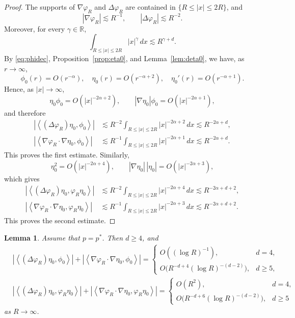 \documentclass[12pt, a4paper, reqno]{amsart}
\numberwithin{equation}{section}
\newtheorem{lemma}[theorem]{Lemma}
\theoremstyle{definition}
\theoremstyle{remark}
\newcommand{\R}{\mathbb R}
\def\tbra[#1,#2]{{\left\langle #1,#2\right\rangle}}
\def\abs[#1]{{\left\vert #1 \right\vert}}
\begin{document}
\begin{proof}
The supports of $\nabla\varphi_R$ and $\Delta\varphi_R$ are contained in
$\{R\le|x|\le2R\}$, and
\[
  \abs[\nabla\varphi_R]\lesssim R^{-1},
  \qquad
  \abs[\Delta\varphi_R]\lesssim R^{-2}.
\]
Moreover, for every $\gamma\in\R$,
\[
  \int_{R\le|x|\le2R}|x|^\gamma\,dx\lesssim R^{\gamma+d}.
\]
By \eqref{eq:phidec}, Proposition~\ref{prop:eta0}, and
Lemma~\ref{lem:deta0}, we have, as \(r\to\infty\),
\[
  \phi_0(r)=O(r^{-\alpha}),
  \quad
  \eta_0(r)=O(r^{-\alpha+2}),
  \quad
  \eta_0'(r)=O(r^{-\alpha+1}).
\]
Hence, as \(|x|\to\infty\),
\[
  \eta_0\phi_0=O(|x|^{-2\alpha+2}),
  \qquad
  |\nabla\eta_0|\phi_0=O(|x|^{-2\alpha+1}),
\]
and therefore
\begin{align*}
  \abs[{\tbra[(\Delta\varphi_R)\eta_0,\phi_0]}]
  &\lesssim R^{-2}
    \int_{R\le|x|\le2R}|x|^{-2\alpha+2}\,dx
   \lesssim R^{-2\alpha+d},
  \\
  \abs[{\tbra[\nabla\varphi_R\cdot\nabla\eta_0,\phi_0]}]
  &\lesssim R^{-1}
    \int_{R\le|x|\le2R}|x|^{-2\alpha+1}\,dx
   \lesssim R^{-2\alpha+d}.
\end{align*}
This proves the first estimate. Similarly,
\[
  \eta_0^2=O(|x|^{-2\alpha+4}),
  \qquad
  |\nabla\eta_0|\,|\eta_0|=O(|x|^{-2\alpha+3}),
\]
which gives
\begin{align*}
  \abs[{\tbra[(\Delta\varphi_R)\eta_0,\varphi_R\eta_0]}]
  &\lesssim R^{-2}
    \int_{R\le|x|\le2R}|x|^{-2\alpha+4}\,dx
   \lesssim R^{-2\alpha+d+2},
  \\
  \abs[{\tbra[\nabla\varphi_R\cdot\nabla\eta_0,
                  \varphi_R\eta_0]}]
  &\lesssim R^{-1}
    \int_{R\le|x|\le2R}|x|^{-2\alpha+3}\,dx
   \lesssim R^{-2\alpha+d+2}.
\end{align*}
This proves the second estimate.
\end{proof}

\begin{lemma}\label{lem:cut-c}
Assume that $p=p^*$. Then $d\ge4$, and
\begin{align*}
  &\abs[{\tbra[(\Delta\varphi_R)\eta_0,\phi_0]}]
   +\abs[{\tbra[\nabla\varphi_R\cdot\nabla\eta_0,\phi_0]}]
   =
   \begin{cases}
     O((\log R)^{-1}), & d=4,\\[2pt]
     O\bigl(R^{-d+4}(\log R)^{-(d-2)}\bigr), & d\ge5,
   \end{cases}
   \\
  &\abs[{\tbra[(\Delta\varphi_R)\eta_0,\varphi_R\eta_0]}]
   +\abs[{\tbra[\nabla\varphi_R\cdot\nabla\eta_0,
                   \varphi_R\eta_0]}]
  =
   \begin{cases}
     O(R^2), & d=4,\\[2pt]
     O\bigl(R^{-d+6}(\log R)^{-(d-2)}\bigr), & d\ge5
   \end{cases}
\end{align*}
as $R\to\infty$.
\end{lemma}
\end{document}
